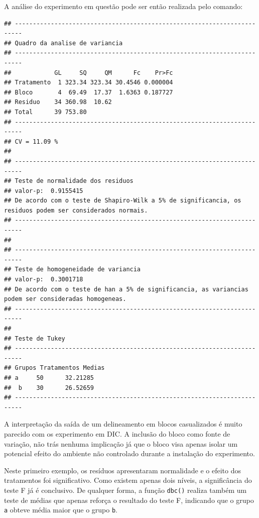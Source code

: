 \documentclass[
]{article}
\newenvironment{Shaded}{\begin{snugshade}}{\end{snugshade}}
\newcommand{\DataTypeTok}[1]{\textcolor[rgb]{0.13,0.29,0.53}{#1}}
\newcommand{\KeywordTok}[1]{\textcolor[rgb]{0.13,0.29,0.53}{\textbf{#1}}}
\newcommand{\NormalTok}[1]{#1}
\newcommand{\OperatorTok}[1]{\textcolor[rgb]{0.81,0.36,0.00}{\textbf{#1}}}
\newcommand{\StringTok}[1]{\textcolor[rgb]{0.31,0.60,0.02}{#1}}
\begin{document}
A análise do experimento em questão pode ser então realizada pelo comando:

\begin{Shaded}
\end{Shaded}

\begin{verbatim}
## ------------------------------------------------------------------------
## Quadro da analise de variancia
## ------------------------------------------------------------------------
##            GL     SQ     QM      Fc    Pr>Fc
## Tratamento  1 323.34 323.34 30.4546 0.000004
## Bloco       4  69.49  17.37  1.6363 0.187727
## Residuo    34 360.98  10.62                 
## Total      39 753.80                        
## ------------------------------------------------------------------------
## CV = 11.09 %
## 
## ------------------------------------------------------------------------
## Teste de normalidade dos residuos 
## valor-p:  0.9155415 
## De acordo com o teste de Shapiro-Wilk a 5% de significancia, os residuos podem ser considerados normais.
## ------------------------------------------------------------------------
## 
## ------------------------------------------------------------------------
## Teste de homogeneidade de variancia 
## valor-p:  0.3001718 
## De acordo com o teste de han a 5% de significancia, as variancias podem ser consideradas homogeneas.
## ------------------------------------------------------------------------
## 
## Teste de Tukey
## ------------------------------------------------------------------------
## Grupos Tratamentos Medias
## a     50      32.21285 
##  b    30      26.52659 
## ------------------------------------------------------------------------
\end{verbatim}

A interpretação da saída de um delineamento em blocos casualizados é muito parecido com os experimento em DIC. A inclusão do bloco como fonte de variação, não trás nenhuma implicação já que o bloco visa apenas isolar um potencial efeito do ambiente não controlado durante a instalação do experimento.

Neste primeiro exemplo, os resíduos apresentaram normalidade e o efeito dos tratamentos foi significativo. Como existem apenas dois níveis, a significância do teste F já é conclusivo. De qualquer forma, a função \texttt{dbc()} realiza também um teste de médias que apenas reforça o resultado do teste F, indicando que o grupo \texttt{a} obteve média maior que o grupo \texttt{b}.
\end{document}
